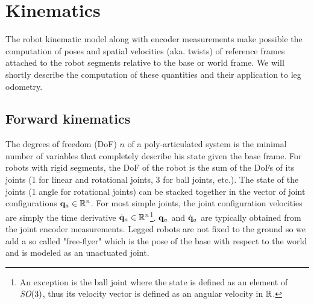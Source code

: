 \chapter{Kinematics}
\minitoc

The robot kinematic model along with encoder measurements make possible the computation of poses and spatial velocities \cite{featherstone2014rigid} (aka. twists) 
of reference frames attached to the robot segments relative to the base or world frame. We will shortly describe the computation of these quantities and their 
application to leg odometry.


\section{Forward kinematics}
\label{sec:forward_kinematics}
The degrees of freedom (DoF) $n$ of a poly-articulated system is the minimal number of variables that completely describe his state given the base frame. 
For robots with rigid segments, the DoF of the robot is the sum of the DoFs of its joints (1 for linear and rotational joints, 3 for
ball joints, etc.).
The state of the joints (1 angle for rotational joints) can be stacked together in the vector of joint configurations 
${\bf q}_a \in \mathbb{R}^n$. For most simple joints, the joint configuration velocities are simply the time derivative $\dot{{\bf q}}_a \in \mathbb{R}^n$\footnote{An exception is the ball joint where the 
state is defined as an element of $\textit{SO}(3)$, thus its velocity vector is defined as an angular velocity in $\mathbb{R}$.}. ${\bf q}_a$ and $\dot{{\bf q}}_a$ are typically obtained from
the joint encoder measurements.
Legged robots are not fixed to the ground so we add a so called "free-flyer" which is the pose of the base with respect to the world and is modeled as an unactuated joint. 

